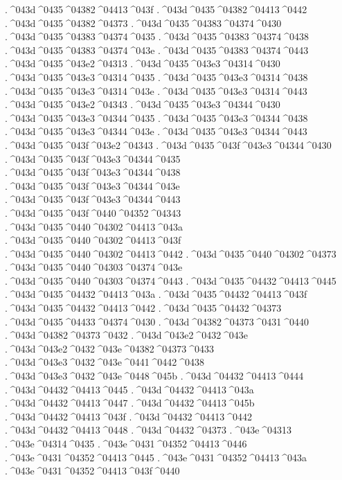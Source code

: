 {.^^^^043d^^^^0435^^^^04382^^^^04413^^^^043f
.^^^^043d^^^^0435^^^^04382^^^^04413^^^^0442
.^^^^043d^^^^0435^^^^04382^^^^04373
.^^^^043d^^^^0435^^^^04383^^^^04374^^^^0430
.^^^^043d^^^^0435^^^^04383^^^^04374^^^^0435
.^^^^043d^^^^0435^^^^04383^^^^04374^^^^0438
.^^^^043d^^^^0435^^^^04383^^^^04374^^^^043e
.^^^^043d^^^^0435^^^^04383^^^^04374^^^^0443
.^^^^043d^^^^0435^^^^043e2^^^^04313
.^^^^043d^^^^0435^^^^043e3^^^^04314^^^^0430
.^^^^043d^^^^0435^^^^043e3^^^^04314^^^^0435
.^^^^043d^^^^0435^^^^043e3^^^^04314^^^^0438
.^^^^043d^^^^0435^^^^043e3^^^^04314^^^^043e
.^^^^043d^^^^0435^^^^043e3^^^^04314^^^^0443
.^^^^043d^^^^0435^^^^043e2^^^^04343
.^^^^043d^^^^0435^^^^043e3^^^^04344^^^^0430
.^^^^043d^^^^0435^^^^043e3^^^^04344^^^^0435
.^^^^043d^^^^0435^^^^043e3^^^^04344^^^^0438
.^^^^043d^^^^0435^^^^043e3^^^^04344^^^^043e
.^^^^043d^^^^0435^^^^043e3^^^^04344^^^^0443
.^^^^043d^^^^0435^^^^043f^^^^043e2^^^^04343
.^^^^043d^^^^0435^^^^043f^^^^043e3^^^^04344^^^^0430
.^^^^043d^^^^0435^^^^043f^^^^043e3^^^^04344^^^^0435
.^^^^043d^^^^0435^^^^043f^^^^043e3^^^^04344^^^^0438
.^^^^043d^^^^0435^^^^043f^^^^043e3^^^^04344^^^^043e
.^^^^043d^^^^0435^^^^043f^^^^043e3^^^^04344^^^^0443
.^^^^043d^^^^0435^^^^043f^^^^0440^^^^04352^^^^04343
.^^^^043d^^^^0435^^^^0440^^^^04302^^^^04413^^^^043a
.^^^^043d^^^^0435^^^^0440^^^^04302^^^^04413^^^^043f
.^^^^043d^^^^0435^^^^0440^^^^04302^^^^04413^^^^0442
.^^^^043d^^^^0435^^^^0440^^^^04302^^^^04373
.^^^^043d^^^^0435^^^^0440^^^^04303^^^^04374^^^^043e
.^^^^043d^^^^0435^^^^0440^^^^04303^^^^04374^^^^0443
.^^^^043d^^^^0435^^^^04432^^^^04413^^^^0445
.^^^^043d^^^^0435^^^^04432^^^^04413^^^^043a
.^^^^043d^^^^0435^^^^04432^^^^04413^^^^043f
.^^^^043d^^^^0435^^^^04432^^^^04413^^^^0442
.^^^^043d^^^^0435^^^^04432^^^^04373
.^^^^043d^^^^0435^^^^04433^^^^04374^^^^0430
.^^^^043d^^^^04382^^^^04373^^^^0431^^^^0440
.^^^^043d^^^^04382^^^^04373^^^^0432
.^^^^043d^^^^043e2^^^^0432^^^^043e
.^^^^043d^^^^043e2^^^^0432^^^^043e^^^^04382^^^^04373^^^^0433
.^^^^043d^^^^043e3^^^^0432^^^^043e^^^^0441^^^^0442^^^^0438
.^^^^043d^^^^043e3^^^^0432^^^^043e^^^^0448^^^^045b
.^^^^043d^^^^04432^^^^04413^^^^0444
.^^^^043d^^^^04432^^^^04413^^^^0445
.^^^^043d^^^^04432^^^^04413^^^^043a
.^^^^043d^^^^04432^^^^04413^^^^0447
.^^^^043d^^^^04432^^^^04413^^^^045b
.^^^^043d^^^^04432^^^^04413^^^^043f
.^^^^043d^^^^04432^^^^04413^^^^0442
.^^^^043d^^^^04432^^^^04413^^^^0448
.^^^^043d^^^^04432^^^^04373
.^^^^043e^^^^04313
.^^^^043e^^^^04314^^^^0435
.^^^^043e^^^^0431^^^^04352^^^^04413^^^^0446
.^^^^043e^^^^0431^^^^04352^^^^04413^^^^0445
.^^^^043e^^^^0431^^^^04352^^^^04413^^^^043a
.^^^^043e^^^^0431^^^^04352^^^^04413^^^^043f^^^^0440
}
